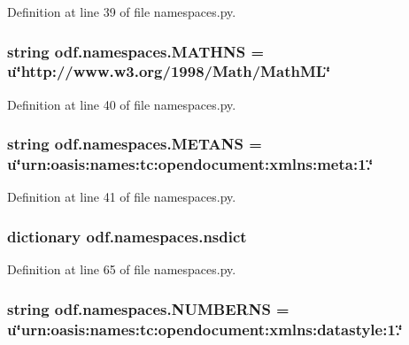 Definition at line 39 of file namespaces.\+py.

\hypertarget{namespaceodf_1_1namespaces_a416dcbc248ffed1b51a741c570e00306}{
\subsubsection[{M\+A\+T\+H\+N\+S}]{\setlength{\rightskip}{0pt plus 5cm}string odf.\+namespaces.\+M\+A\+T\+H\+N\+S = u\char`\"{}http\+://www.\+w3.\+org/1998/Math/Math\+M\+L\char`\"{}}}\label{namespaceodf_1_1namespaces_a416dcbc248ffed1b51a741c570e00306}


Definition at line 40 of file namespaces.\+py.

\hypertarget{namespaceodf_1_1namespaces_a223c0beb389117b2a2549bdb1173f184}{
\subsubsection[{M\+E\+T\+A\+N\+S}]{\setlength{\rightskip}{0pt plus 5cm}string odf.\+namespaces.\+M\+E\+T\+A\+N\+S = u\char`\"{}urn\+:oasis\+:names\+:tc\+:opendocument\+:xmlns\+:meta\+:1.\char`\"{}}}\label{namespaceodf_1_1namespaces_a223c0beb389117b2a2549bdb1173f184}


Definition at line 41 of file namespaces.\+py.

\hypertarget{namespaceodf_1_1namespaces_ae5c4cfaeef44ee2715cc52f618fc7397}{
\subsubsection[{nsdict}]{\setlength{\rightskip}{0pt plus 5cm}dictionary odf.\+namespaces.\+nsdict}}\label{namespaceodf_1_1namespaces_ae5c4cfaeef44ee2715cc52f618fc7397}


Definition at line 65 of file namespaces.\+py.

\hypertarget{namespaceodf_1_1namespaces_a4555107194c538783a780aebf6137d88}{
\subsubsection[{N\+U\+M\+B\+E\+R\+N\+S}]{\setlength{\rightskip}{0pt plus 5cm}string odf.\+namespaces.\+N\+U\+M\+B\+E\+R\+N\+S = u\char`\"{}urn\+:oasis\+:names\+:tc\+:opendocument\+:xmlns\+:datastyle\+:1.\char`\"{}}}\label{namespaceodf_1_1namespaces_a4555107194c538783a780aebf6137d88}


